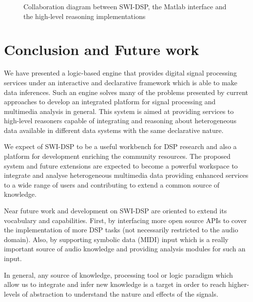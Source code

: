 \documentclass[runningheads]{llncs}
\begin{document}
\begin{figure}
\centerline{}
\caption{Collaboration diagram between SWI-DSP, the Matlab interface and the high-level reasoning implementations}
\label{fig:reasoners}
\end{figure}

\section{Conclusion and Future work}\label{sec:conclusion}

We have presented a logic-based engine that provides digital signal processing services under an interactive and declarative framework which is able to make data inferences. Such an engine solves many of the problems presented by current approaches to develop an integrated platform for signal processing and multimedia analysis in general. This system is aimed at providing services to high-level reasoners capable of integrating and reasoning about heterogeneous data available in different data systems with the same declarative nature.

We expect of SWI-DSP to be a useful workbench for DSP research and also a platform for development enriching the community resources. The proposed system and future extensions are expected to become a powerful workspace to integrate and analyse heterogeneous multimedia data providing enhanced services to a wide range of users and contributing to extend a common source of knowledge.

Near future work and development on SWI-DSP are oriented to extend its vocabulary and capabilities. First, by interfacing more open source APIs to cover the implementation of more DSP tasks (not necessarily restricted to the audio domain). Also, by supporting symbolic data (MIDI) input which is a really important source of audio knowledge and providing analysis modules for such an input.

In general, any source of knowledge, processing tool or logic paradigm which allow us to integrate and infer new knowledge is a target in order to reach higher-levels of abstraction to understand the nature and effects of the signals.
\end{document}
